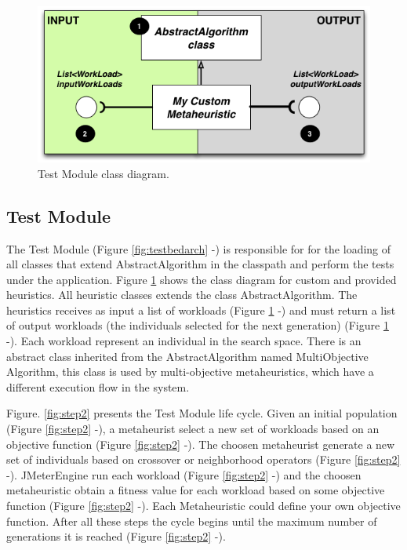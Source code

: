\documentclass{report}
\begin{document}
\begin{figure}[h]
\begin{minipage}{.5\textwidth}
\centering
\includegraphics[width=1\textwidth]{./images/myheuristic.png}
\caption{Test Module class diagram.}
\label{fig:heuristicclassdiagram}
\end{minipage}
\end{figure} 



\subsection{Test Module}

The Test Module (Figure \ref{fig:testbedarch}  -) is responsible for for the loading of all classes that extend AbstractAlgorithm in the classpath and perform the tests under the application. Figure \ref{fig:heuristicclassdiagram} shows the  class diagram for custom and provided heuristics. All heuristic classes extends the class AbstractAlgorithm. The heuristics receives  as input a  list of workloads (Figure \ref{fig:heuristicclassdiagram}  -) and must return a list of output workloads (the individuals selected for the next generation)  (Figure \ref{fig:heuristicclassdiagram}  -). Each workload represent an individual in the search space. There is an abstract class inherited from the AbstractAlgorithm named MultiObjective Algorithm, this class is used by multi-objective metaheuristics, which have a different execution flow in the system.

Figure. \ref{fig:step2} presents the Test Module life cycle. Given an initial population (Figure \ref{fig:step2}  -),  a metaheurist select a new set of workloads based on an objective function (Figure \ref{fig:step2}  -). The choosen metaheurist generate a new set of individuals based on crossover or neighborhood operators (Figure \ref{fig:step2}  -).  JMeterEngine run each workload (Figure \ref{fig:step2}  -) and the choosen metaheuristic obtain a fitness value for each workload based on some objective function  (Figure \ref{fig:step2}  -). Each Metaheuristic could define your own objective function. After all these steps the cycle begins until the maximum number of generations it is reached (Figure \ref{fig:step2}  -). 
\end{document}
